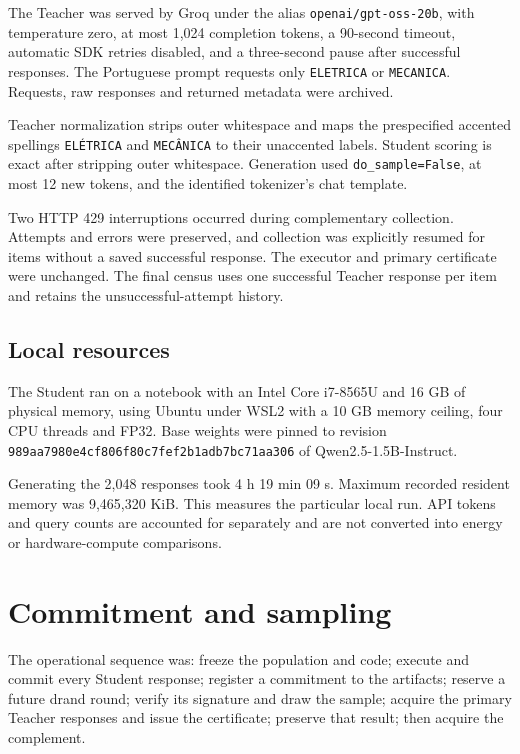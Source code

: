 \documentclass[
  10pt,
]{article}
\let\oldsection\section
\renewcommand{\section}{\needspace{5\baselineskip}\oldsection}
\begin{document}
The Teacher was served by Groq under the alias
\texttt{openai/gpt-oss-20b}, with temperature zero, at most 1,024
completion tokens, a 90-second timeout, automatic SDK retries disabled,
and a three-second pause after successful responses. The Portuguese
prompt requests only \texttt{ELETRICA} or \texttt{MECANICA}. Requests,
raw responses and returned metadata were archived.

Teacher normalization strips outer whitespace and maps the prespecified
accented spellings \texttt{ELÉTRICA} and \texttt{MECÂNICA} to their
unaccented labels. Student scoring is exact after stripping outer
whitespace. Generation used \texttt{do\_sample=False}, at most 12 new
tokens, and the identified tokenizer's chat template.

Two HTTP 429 interruptions occurred during complementary collection.
Attempts and errors were preserved, and collection was explicitly
resumed for items without a saved successful response. The executor and
primary certificate were unchanged. The final census uses one successful
Teacher response per item and retains the unsuccessful-attempt history.

\hypertarget{local-resources}{%
\subsection{Local resources}\label{local-resources}}

The Student ran on a notebook with an Intel Core i7-8565U and 16 GB of
physical memory, using Ubuntu under WSL2 with a 10 GB memory ceiling,
four CPU threads and FP32. Base weights were pinned to revision
\texttt{989aa7980e4cf806f80c7fef2b1adb7bc71aa306} of
Qwen2.5-1.5B-Instruct.

Generating the 2,048 responses took 4 h 19 min 09 s. Maximum recorded
resident memory was 9,465,320 KiB. This measures the particular local
run. API tokens and query counts are accounted for separately and are
not converted into energy or hardware-compute comparisons.

\hypertarget{commitment-and-sampling}{%
\section{Commitment and sampling}\label{commitment-and-sampling}}

The operational sequence was: freeze the population and code; execute
and commit every Student response; register a commitment to the
artifacts; reserve a future drand round; verify its signature and draw
the sample; acquire the primary Teacher responses and issue the
certificate; preserve that result; then acquire the complement.
\end{document}
